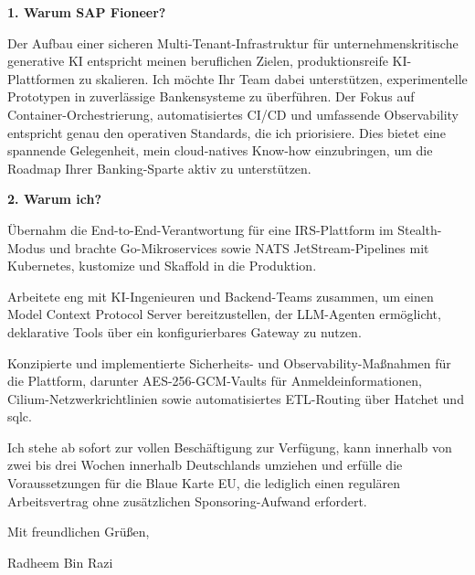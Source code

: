 \documentclass[11pt,a4paper]{coverletter}
\begin{document}
\vspace{8pt}\noindent\textbf{1. Warum SAP Fioneer?}\par\vspace{3pt}

Der Aufbau einer sicheren Multi-Tenant-Infrastruktur für unternehmenskritische generative KI entspricht meinen beruflichen Zielen, produktionsreife KI-Plattformen zu skalieren. Ich möchte Ihr Team dabei unterstützen, experimentelle Prototypen in zuverlässige Bankensysteme zu überführen. Der Fokus auf Container-Orchestrierung, automatisiertes CI/CD und umfassende Observability entspricht genau den operativen Standards, die ich priorisiere. Dies bietet eine spannende Gelegenheit, mein cloud-natives Know-how einzubringen, um die Roadmap Ihrer Banking-Sparte aktiv zu unterstützen.

\vspace{8pt}\noindent\textbf{2. Warum ich?}\par\vspace{3pt}

\bullets

  \item Übernahm die End-to-End-Verantwortung für eine IRS-Plattform im Stealth-Modus und brachte Go-Mikroservices sowie NATS JetStream-Pipelines mit Kubernetes, kustomize und Skaffold in die Produktion.

  \item Arbeitete eng mit KI-Ingenieuren und Backend-Teams zusammen, um einen Model Context Protocol Server bereitzustellen, der LLM-Agenten ermöglicht, deklarative Tools über ein konfigurierbares Gateway zu nutzen.

  \item Konzipierte und implementierte Sicherheits- und Observability-Maßnahmen für die Plattform, darunter AES-256-GCM-Vaults für Anmeldeinformationen, Cilium-Netzwerkrichtlinien sowie automatisiertes ETL-Routing über Hatchet und sqlc.

\bulletsend

Ich stehe ab sofort zur vollen Beschäftigung zur Verfügung, kann innerhalb von zwei bis drei Wochen innerhalb Deutschlands umziehen und erfülle die Voraussetzungen für die Blaue Karte EU, die lediglich einen regulären Arbeitsvertrag ohne zusätzlichen Sponsoring-Aufwand erfordert.

\closing{Mit freundlichen Grüßen,}{Radheem Bin Razi}
\end{document}
